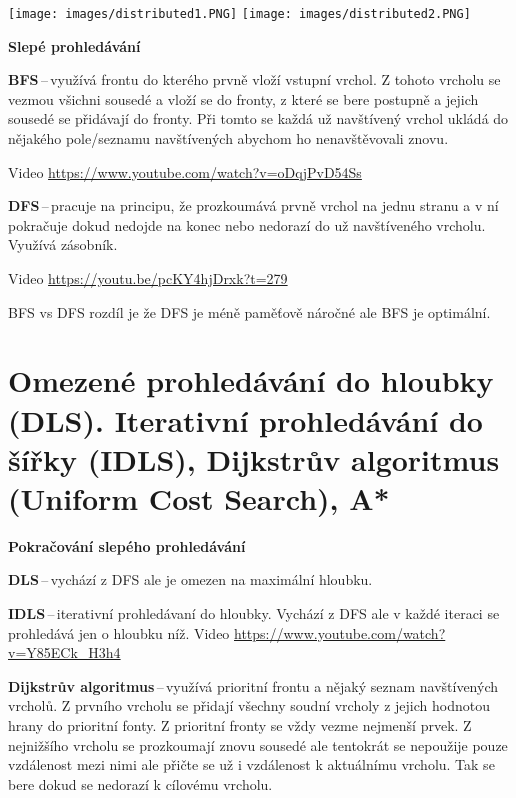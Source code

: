 \begin{center}
\texttt{[image: images/distributed1.PNG]}
\texttt{[image: images/distributed2.PNG]}
\end{center}

\begin{Large}\vspace{0,5cm} \textbf{Slepé prohledávání}
\end{Large}

\textbf{BFS}\,--\,využívá frontu do kterého prvně vloží vstupní vrchol. Z tohoto vrcholu se vezmou všichni sousedé a vloží se do fronty, z které se bere postupně a jejich sousedé se přidávají do fronty. Při tomto se každá už navštívený vrchol ukládá do nějakého pole/seznamu navštívených abychom ho nenavštěvovali znovu.

Video \url{https://www.youtube.com/watch?v=oDqjPvD54Ss}

\textbf{DFS}\,--\,pracuje na principu, že prozkoumává prvně vrchol na jednu stranu a v ní pokračuje dokud nedojde na konec nebo nedorazí do už navštíveného vrcholu. Využívá zásobník.

Video \url{https://youtu.be/pcKY4hjDrxk?t=279}

BFS vs DFS rozdíl je že DFS je méně paměťově náročné ale BFS je optimální.










\clearpage
\section{Omezené prohledávání do hloubky (DLS). Iterativní prohledávání do šířky (IDLS), Dijkstrův algoritmus (Uniform Cost Search), A*}
\begin{Large}\vspace{0,5cm} \textbf{Pokračování slepého prohledávání}
\end{Large}

\textbf{DLS}\,--\,vychází z DFS ale je omezen na maximální hloubku.

\textbf{IDLS}\,--\,iterativní prohledávaní do hloubky. Vychází z DFS ale v každé iteraci se prohledává jen o hloubku níž. Video \url{https://www.youtube.com/watch?v=Y85ECk_H3h4}

\textbf{Dijkstrův algoritmus}\,--\,využívá prioritní frontu a nějaký seznam navštívených vrcholů. Z prvního vrcholu se přidají všechny soudní vrcholy z jejich hodnotou hrany do prioritní fonty. Z prioritní fronty se vždy vezme nejmenší prvek. Z nejnižšího vrcholu se prozkoumají znovu sousedé ale tentokrát se nepoužije pouze vzdálenost mezi nimi ale přičte se už i vzdálenost k aktuálnímu vrcholu. Tak se bere dokud se nedorazí k cílovému vrcholu.

